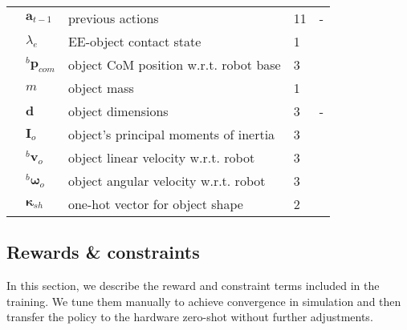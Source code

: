 \begin{table}
\begin{center}
\begin{tabular}{P{0.25cm}|P{0.55cm}|p{4.25cm}|P{0.35cm}|P{1.1cm}}
   & $\pmb a_{t-1}$              & previous actions                           & 11       & -                    \\
   \hhline{=|=|=|=|=}
    & $\lambda_{e}$              & EE-object contact state                    & 1       &                       \\ 
   & $^b\pmb p_{com}$            & object CoM position w.r.t. robot base         & 3       &                       \\ 
   & $m$                         & object mass                                & 1       &                       \\ 
   & $\pmb d$                    & object dimensions                   & 3       & -                     \\ 
   & $\pmb I_o$                  & object's principal moments of inertia      & 3       &                       \\ 
   & $^b\pmb v_{o}$            & object linear velocity w.r.t. robot      & 3       &                       \\ 
   & $^b\pmb \omega_{o}$       & object angular velocity w.r.t. robot     & 3       &                       \\ 
   & $\pmb \kappa_{sh}$          & one-hot vector for object shape            & 2       &                       \\ \hline    
   \end{tabular}
\end{center}
\end{table}


%
\subsection{Rewards \& constraints}
\label{sec:rewards_constraints}
In this section, we describe the reward and constraint terms included in the training. We tune them manually to achieve convergence in simulation and then transfer the policy to the hardware zero-shot without further adjustments.


